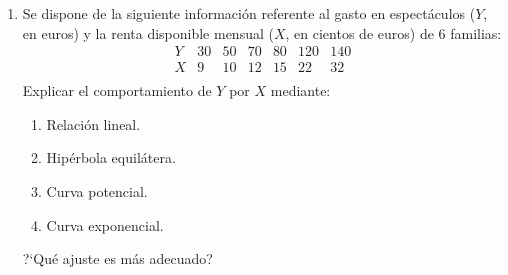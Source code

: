 \documentclass[11pt]{book}
\begin{document}
\begin{enumerate}
\item Se dispone de la siguiente informaci{\'o}n referente al gasto en espect{\'a}culos ($Y$,  en euros) y la renta disponible mensual  ($X$,  en cientos de euros) de  6 familias:
$$
    \begin{array}{c|cccccc}
      Y & 30 & 50 & 70 & 80 & 120  & 140 \\ \hline
      X &  9  &  10  &  12  & 15  & 22 & 32  \\
    \end{array}
$$
   Explicar el comportamiento de $Y$ por $X$ mediante:

  \begin{enumerate}
     \item Relaci{\'o}n lineal.
     \item Hip{\'e}rbola equil{\'a}tera.
     \item Curva potencial.
     \item Curva exponencial.
  \end{enumerate}
   ?`Qu{\'e} ajuste es m{\'a}s adecuado?
\end{enumerate}
\end{document}
